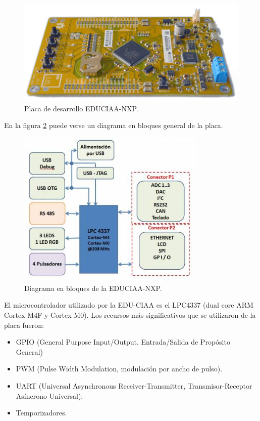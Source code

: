 \begin{figure}[htpb]
	\centering
	\includegraphics[width=\textwidth]{./Figures/EDUCIAANXP.jpg}
	\caption{Placa de desarrollo EDUCIAA-NXP\protect\footnotemark.}
	\label{fig:EDUCIAANXP}
\end{figure}

\pagebreak

En la figura \ref{fig:Bloques} puede verse un diagrama en bloques general de la placa. 

\begin{figure}[htpb]
	\centering
	\includegraphics[width=9cm]{./Figures/Bloques.jpg}
	\caption{Diagrama en bloques de la EDUCIAA-NXP\protect\footnotemark.}
	\label{fig:Bloques}
\end{figure}

El  microcontrolador utilizado por la EDU-CIAA es el LPC4337 (dual core ARM Cortex-M4F y Cortex-M0). Los recursos más significativos que se utilizaron de la placa fueron: 


\begin{itemize}
	\item GPIO (General Purpose Input/Output, Entrada/Salida de Propósito General)
	\item PWM (Pulse Width Modulation, modulación por ancho de pulso).
	\item UART (Universal Asynchronous Receiver-Transmitter, Transmisor-Receptor Asíncrono Universal).
	\item Temporizadores.
\end{itemize}

